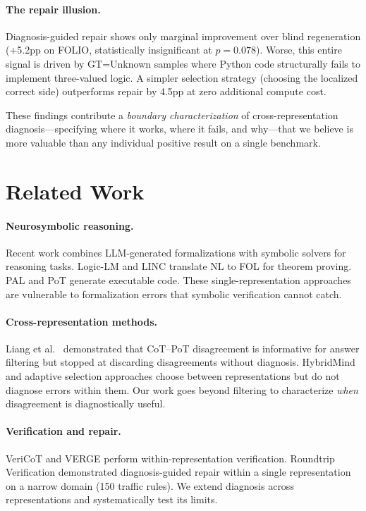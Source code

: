 \documentclass[11pt,a4paper]{article}
\begin{document}
\paragraph{The repair illusion.} Diagnosis-guided repair shows only marginal improvement over blind regeneration (+5.2pp on FOLIO, statistically insignificant at $p=0.078$). Worse, this entire signal is driven by GT=Unknown samples where Python code structurally fails to implement three-valued logic. A simpler selection strategy (choosing the localized correct side) outperforms repair by 4.5pp at zero additional compute cost.

These findings contribute a \textit{boundary characterization} of cross-representation diagnosis---specifying where it works, where it fails, and why---that we believe is more valuable than any individual positive result on a single benchmark.

\section{Related Work}

\paragraph{Neurosymbolic reasoning.}
Recent work combines LLM-generated formalizations with symbolic solvers for reasoning tasks. Logic-LM \cite{pan2023logic} and LINC \cite{olausson2023linc} translate NL to FOL for theorem proving. PAL \cite{gao2023pal} and PoT \cite{chen2023pot} generate executable code. These single-representation approaches are vulnerable to formalization errors that symbolic verification cannot catch.

\paragraph{Cross-representation methods.}
Liang et al.~\cite{liang2024cot_pot} demonstrated that CoT--PoT disagreement is informative for answer filtering but stopped at discarding disagreements without diagnosis. HybridMind and adaptive selection approaches choose between representations but do not diagnose errors within them. Our work goes beyond filtering to characterize \textit{when} disagreement is diagnostically useful.

\paragraph{Verification and repair.}
VeriCoT and VERGE perform within-representation verification. Roundtrip Verification \cite{roundtrip2026} demonstrated diagnosis-guided repair within a single representation on a narrow domain (150 traffic rules). We extend diagnosis across representations and systematically test its limits.
\end{document}
